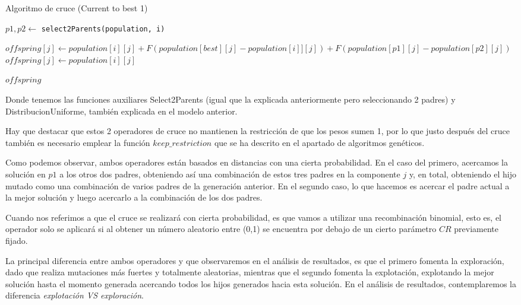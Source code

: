 \begin{itemize}
		\begin{algorithm}[H]
			\caption{Algoritmo de cruce (Current to best 1)}
			\label{alg:best}
			\begin{algorithmic}[1]
				
				\State $p1,p2 \gets $ \texttt{select2Parents(population, i)} 
				
				\State $offspring[j] \gets population[i][j] + F (population[best][j] - population[i]][j]) + F(population[p1][j] - population[p2][j]) $
				\Else
				\State $offspring[j] \gets population[i][j]$
				\EndIf
				
				
				\EndFor
				
				
				\Return $offspring$
				
				\EndProcedure
			\end{algorithmic}
		\end{algorithm}
		Donde tenemos las funciones auxiliares Select2Parents (igual que la explicada anteriormente pero seleccionando 2 padres) y DistribucionUniforme, también explicada en el modelo anterior.
	\end{itemize}
	 
	 Hay que destacar que estos 2 operadores de cruce no mantienen la restricción de que los pesos sumen 1, por lo que justo después del cruce también es necesario emplear la función $keep\_restriction$ que se ha descrito en el apartado de algoritmos genéticos.
	
	Como podemos observar, ambos operadores están basados en distancias con una cierta probabilidad. En el caso del primero, acercamos la solución en $p1$ a los otros dos padres, obteniendo así una combinación de estos tres padres en la componente $j$ y, en total, obteniendo el hijo mutado como una combinación de varios padres de la generación anterior. En el segundo caso, lo que hacemos es acercar el padre actual a la mejor solución y luego acercarlo a la combinación de los dos padres. 
	
	Cuando nos referimos a que el cruce se realizará con cierta probabilidad, es que vamos a utilizar una recombinación binomial, esto es, el operador solo se aplicará si al obtener un número aleatorio entre (0,1) se encuentra por debajo de un cierto parámetro $CR$ previamente fijado.
	
	La principal diferencia entre ambos operadores y que observaremos en el análisis de resultados, es que el primero fomenta la exploración, dado que realiza mutaciones más fuertes y totalmente aleatorias, mientras que el segundo fomenta la explotación, explotando la mejor solución hasta el momento generada acercando todos los hijos generados hacia esta solución. En el análisis de resultados, contemplaremos la diferencia \textit{explotación VS exploración}.
	
